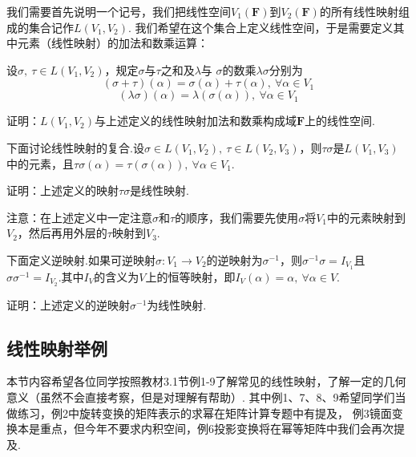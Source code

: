 我们需要首先说明一个记号，我们把线性空间$V_1(\mathbf{F})$到$V_2(\mathbf{F})$的所有线性映射组成的集合记作$L(V_1,V_2)$.
我们希望在这个集合上定义线性空间，于是需要定义其中元素（线性映射）的加法和数乘运算：
\begin{definition}
	设$\sigma,\ \tau\in L(V_1,V_2)$，规定$\sigma$与$\tau$之和及$\lambda$与
	$\sigma$的数乘$\lambda\sigma$分别为
	\begin{equation}
		(\sigma+\tau)(\alpha)=\sigma(\alpha)+\tau(\alpha),\ \forall\alpha\in V_1
	\end{equation}
	\begin{equation}
		(\lambda\sigma)(\alpha)=\lambda(\sigma(\alpha)),\ \forall\alpha\in V_1
	\end{equation}
\end{definition}
\begin{example}
	证明：$L(V_1,V_2)$与上述定义的线性映射加法和数乘构成域$\mathbf{F}$上的线性空间.
\end{example}
下面讨论线性映射的复合.设$\sigma \in L(V_1,V_2),\ \tau \in L(V_2,V_3)$，则$\tau\sigma$是$L(V_1,V_3)$
中的元素，且$\tau\sigma(\alpha)=\tau(\sigma(\alpha)),\ \forall \alpha \in V_1$.
\begin{example}
	证明：上述定义的映射$\tau\sigma$是线性映射.
\end{example}
注意：在上述定义中一定注意$\sigma$和$\tau$的顺序，我们需要先使用$\sigma$将$V_1$中的元素映射到
$V_2$，然后再用外层的$\tau$映射到$V_3$.

下面定义逆映射.如果可逆映射$\sigma:V_1 \to V_2$的逆映射为$\sigma^{-1}$，则$\sigma^{-1}\sigma=I_{V_1}$且
$\sigma\sigma^{-1}=I_{V_2}$.其中$I_{V}$的含义为$V$上的恒等映射，即$I_V(\alpha)=\alpha,\ \forall \alpha \in V$.
\begin{example}
	证明：上述定义的逆映射$\sigma^{-1}$为线性映射.
\end{example}
\subsection{线性映射举例}
本节内容希望各位同学按照教材3.1节例1-9了解常见的线性映射，了解一定的几何意义（虽然不会直接考察，但是对理解有帮助）.
其中例1、7、8、9希望同学们当做练习，例2中旋转变换的矩阵表示的求幂在矩阵计算专题中有提及，
例3镜面变换本是重点，但今年不要求内积空间，例6投影变换将在幂等矩阵中我们会再次提及.

